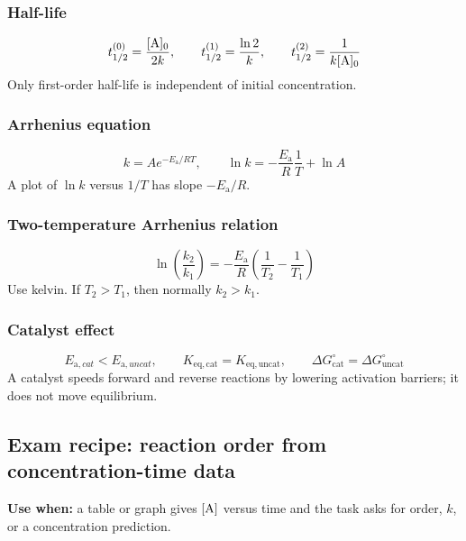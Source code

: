 \subsubsection{Half-life}
\begin{equation}
t_{1/2}^{(0)}=\frac{[\ce{A}]_0}{2k}, \qquad
t_{1/2}^{(1)}=\frac{\ln 2}{k}, \qquad
t_{1/2}^{(2)}=\frac{1}{k[\ce{A}]_0}
\label{eq:kinetics:half-life}
\end{equation}
Only first-order half-life is independent of initial concentration.

\subsubsection{Arrhenius equation}
\begin{equation}
k=Ae^{-E_{\mathrm a}/RT}, \qquad
\ln k=-\frac{E_{\mathrm a}}{R}\frac{1}{T}+\ln A
\label{eq:kinetics:arrhenius}
\end{equation}
A plot of \(\ln k\) versus \(1/T\) has slope \(-E_{\mathrm a}/R\).

\subsubsection{Two-temperature Arrhenius relation}
\begin{equation}
\ln\left(\frac{k_2}{k_1}\right)
=-\frac{E_{\mathrm a}}{R}\left(\frac{1}{T_2}-\frac{1}{T_1}\right)
\label{eq:kinetics:arrhenius-two-temperature}
\end{equation}
Use kelvin. If \(T_2>T_1\), then normally \(k_2>k_1\).

\subsubsection{Catalyst effect}
\begin{equation}
E_{\mathrm a,cat}<E_{\mathrm a,uncat}, \qquad
K_{\mathrm{eq,cat}}=K_{\mathrm{eq,uncat}}, \qquad
\Delta G^\circ_{\mathrm{cat}}=\Delta G^\circ_{\mathrm{uncat}}
\label{eq:kinetics:catalyst-effect}
\end{equation}
A catalyst speeds forward and reverse reactions by lowering activation barriers; it does not move equilibrium.

\subsection{Exam recipe: reaction order from concentration-time data}
\textbf{Use when:} a table or graph gives \([\ce{A}]\) versus time and the task asks for order, \(k\), or a concentration prediction.

